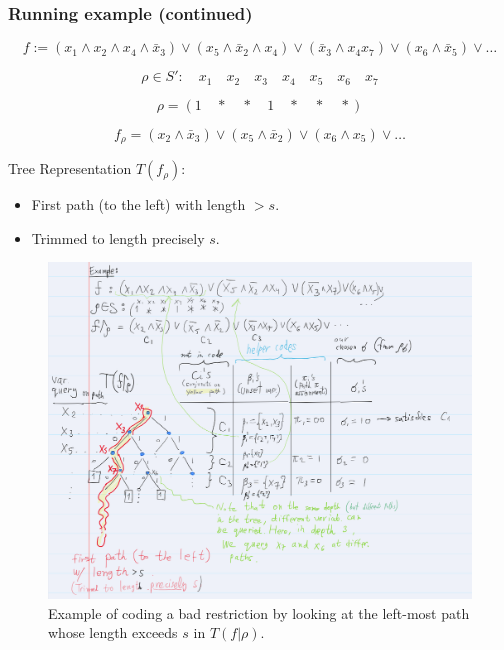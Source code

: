 \subsubsection{Running example (continued)}\label{sec:running-example}
\[
f := (x_1 \wedge x_2 \wedge x_4 \wedge \bar{x}_3) \vee (x_5 \wedge \bar{x}_2 \wedge x_4) \vee (\bar{x}_3 \wedge x_4 x_7) \vee (x_6 \wedge \bar{x}_5) \vee \dots
\]

\[
\rho \in S' : \quad x_1 \quad x_2 \quad x_3 \quad x_4 \quad x_5 \quad x_6 \quad x_7
\]

\[
\rho = (1 \quad * \quad * \quad 1 \quad * \quad * \quad *)
\]

\[
f_{\rho} = (x_2 \wedge \bar{x}_3) \vee (x_5 \wedge \bar{x}_2) \vee (x_6 \wedge x_5) \vee \dots
\]

Tree Representation \(T(f_{\rho})\):
\begin{itemize}
    \item First path (to the left) with length \( > s \).
    \item Trimmed to length precisely \( s \).
\end{itemize}


\begin{figure}[H]
\includegraphics[width=\textwidth]{images/coding-sl-ex1.png}
\caption{Example of coding a bad restriction by looking at the left-most path whose length exceeds $s$ in $T(f|\rho)$. 
}
\end{figure}

